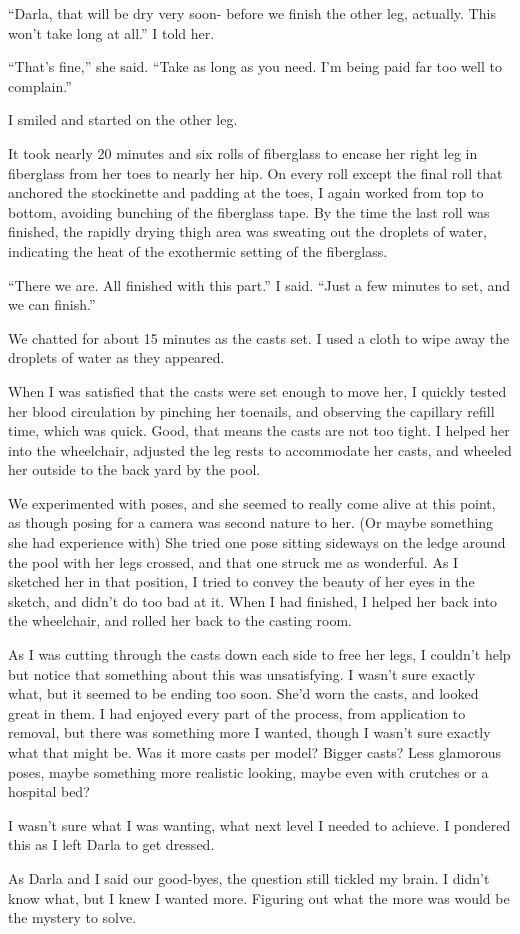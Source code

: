 ``Darla, that will be dry very soon- before we finish the other leg, actually. This won't
take long at all.'' I told her.

``That's fine,'' she said. ``Take as long as you need. I'm being paid far too well to
complain.''

I smiled and started on the other leg.

It took nearly 20 minutes and six rolls of fiberglass to encase her right leg in fiberglass
from her toes to nearly her hip. On every roll except the final roll that anchored the
stockinette and padding at the toes, I again worked from top to bottom, avoiding bunching of the
fiberglass tape. By the time the last roll was finished, the rapidly drying thigh area was
sweating out the droplets of water, indicating the heat of the exothermic setting of the
fiberglass.

``There we are. All finished with this part.'' I said. ``Just a few minutes to set, and we
can finish.''

We chatted for about 15 minutes as the casts set. I used a cloth to wipe away the droplets
of water as they appeared.

When I was satisfied that the casts were set enough to move her, I quickly tested her blood
circulation by pinching her toenails, and observing the capillary refill time, which was quick.
Good, that means the casts are not too tight. I helped her into the wheelchair, adjusted the leg
rests to accommodate her casts, and wheeled her outside to the back yard by the pool.

We experimented with poses, and she seemed to really come alive at this point, as though
posing for a camera was second nature to her. (Or maybe something she had experience with) She
tried one pose sitting sideways on the ledge around the pool with her legs crossed, and that one
struck me as wonderful. As I sketched her in that position, I tried to convey the beauty of her
eyes in the sketch, and didn't do too bad at it. When I had finished, I helped her back into the
wheelchair, and rolled her back to the casting room.

As I was cutting through the casts down each side to free her legs, I couldn't help but
notice that something about this was unsatisfying. I wasn't sure exactly what, but it seemed to
be ending too soon. She'd worn the casts, and looked great in them. I had enjoyed every part of
the process, from application to removal, but there was something more I wanted, though I wasn't
sure exactly what that might be. Was it more casts per model? Bigger casts? Less glamorous
poses, maybe something more realistic looking, maybe even with crutches or a hospital bed?

I wasn't sure what I was wanting, what next level I needed to achieve. I pondered this as I
left Darla to get dressed.

As Darla and I said our good-byes, the question still tickled my brain. I didn't know what,
but I knew I wanted more. Figuring out what the more was would be the mystery to solve.
